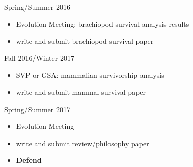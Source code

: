 \documentclass[12pt,letterpaper]{article}
\begin{document}
Spring/Summer 2016
\begin{itemize}
  \item Evolution Meeting: brachiopod survival analysis results
  \item write and submit brachiopod survival paper
\end{itemize}

Fall 2016/Winter 2017
\begin{itemize}
  \item SVP or GSA: mammalian survivorship analysis
  \item write and submit mammal survival paper
\end{itemize}

Spring/Summer 2017
\begin{itemize}
  \item Evolution Meeting
  \item write and submit review/philosophy paper
  \item \textbf{Defend}
\end{itemize}



\clearpage


\end{document}
